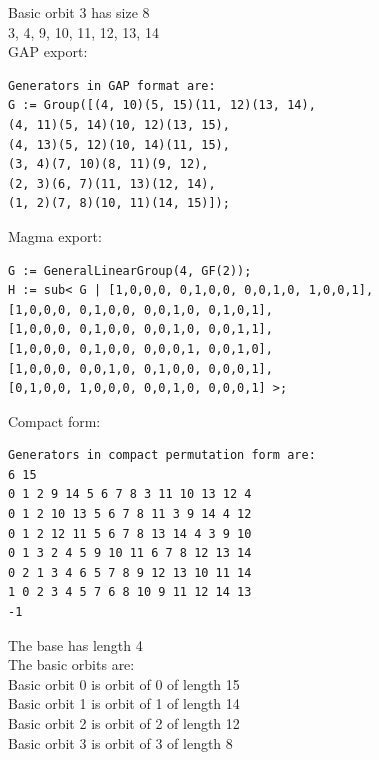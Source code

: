 Basic orbit 3 has size 8\\
3, 4, 9, 10, 11, 12, 13, 14\\
\bigskip
GAP export: \\
\begin{verbatim}
Generators in GAP format are:
G := Group([(4, 10)(5, 15)(11, 12)(13, 14), 
(4, 11)(5, 14)(10, 12)(13, 15), 
(4, 13)(5, 12)(10, 14)(11, 15), 
(3, 4)(7, 10)(8, 11)(9, 12), 
(2, 3)(6, 7)(11, 13)(12, 14), 
(1, 2)(7, 8)(10, 11)(14, 15)]);
\end{verbatim}
Magma export: \\
\begin{verbatim}
G := GeneralLinearGroup(4, GF(2));
H := sub< G | [1,0,0,0, 0,1,0,0, 0,0,1,0, 1,0,0,1], 
[1,0,0,0, 0,1,0,0, 0,0,1,0, 0,1,0,1], 
[1,0,0,0, 0,1,0,0, 0,0,1,0, 0,0,1,1], 
[1,0,0,0, 0,1,0,0, 0,0,0,1, 0,0,1,0], 
[1,0,0,0, 0,0,1,0, 0,1,0,0, 0,0,0,1], 
[0,1,0,0, 1,0,0,0, 0,0,1,0, 0,0,0,1] >;
\end{verbatim}
Compact form: \\
\begin{verbatim}
Generators in compact permutation form are:
6 15
0 1 2 9 14 5 6 7 8 3 11 10 13 12 4 
0 1 2 10 13 5 6 7 8 11 3 9 14 4 12 
0 1 2 12 11 5 6 7 8 13 14 4 3 9 10 
0 1 3 2 4 5 9 10 11 6 7 8 12 13 14 
0 2 1 3 4 6 5 7 8 9 12 13 10 11 14 
1 0 2 3 4 5 7 6 8 10 9 11 12 14 13 
-1
\end{verbatim}
The base has length 4\\
The basic orbits are: \\
Basic orbit 0 is orbit of 0 of length 15\\
Basic orbit 1 is orbit of 1 of length 14\\
Basic orbit 2 is orbit of 2 of length 12\\
Basic orbit 3 is orbit of 3 of length 8\\

